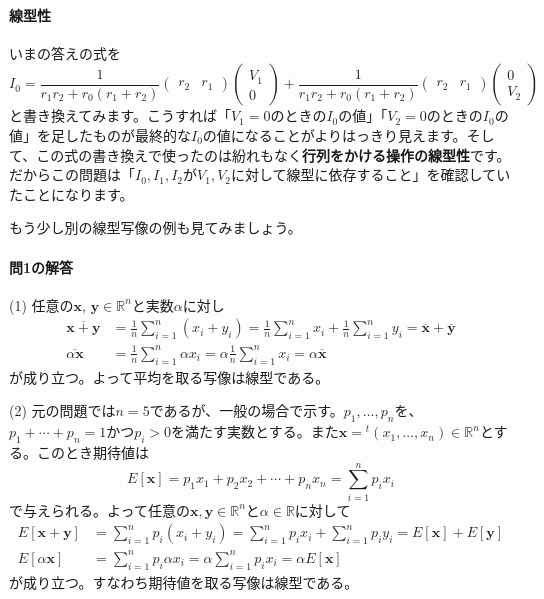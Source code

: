 \paragraph{線型性} いまの答えの式を
\[
I_0
=
\frac{1}{r_1 r_2 + r_0 (r_1 + r_2)}
\begin{pmatrix}
 r_2 & r_1
\end{pmatrix}
\begin{pmatrix}
V_1 \\
0
\end{pmatrix}
+
\frac{1}{r_1 r_2 + r_0 (r_1 + r_2)}
\begin{pmatrix}
 r_2 & r_1
\end{pmatrix}
\begin{pmatrix}
0 \\
V_2
\end{pmatrix}
\]
と書き換えてみます。こうすれば「$V_1 = 0$のときの$I_0$の値」「$V_2 = 0$のときの$I_0$の値」を足したものが最終的な$I_0$の値になることがよりはっきり見えます。そして、この式の書き換えで使ったのは紛れもなく\textbf{行列をかける操作の線型性}です。だからこの問題は「$I_0, I_1, I_2$が$V_1, V_2$に対して線型に依存すること」を確認していたことになります。

もう少し別の線型写像の例も見てみましょう。

\paragraph{問1の解答} (1) 任意の$\bm{x}$, $\bm{y}\in\mathbb{R}^n$と実数$\alpha$に対し
\begin{align*}
\overline{\bm{x} + \bm{y}}
&= \frac{1}{n} \sum_{i = 1}^n (x_i + y_i) = \frac{1}{n} \sum_{i = 1}^n x_i +\frac{1}{n} \sum_{i = 1}^n  y_i
= \overline{\bm{x}} + \overline{\bm{y}} \\
\overline{\alpha \bm{x}}
&= \frac{1}{n} \sum_{i = 1}^n \alpha x_i 
= \alpha \frac{1}{n} \sum_{i = 1}^n x_i 
= \alpha \overline{\bm{x}}
\end{align*}
が成り立つ。よって平均を取る写像は線型である。

\noindent (2) 元の問題では$n = 5$であるが、一般の場合で示す。$p_1,\ldots,p_n$を、$p_1 + \cdots + p_n = 1$かつ$p_i > 0$を満たす実数とする。また$\bm{x} = {}^t(x_1,\ldots, x_n)\in\mathbb{R}^n$とする。このとき期待値は
\[
E[\bm{x}] = p_1 x_1 + p_2 x_2 + \cdots + p_n x_n = \sum_{i = 1}^n p_i x_i
\]
で与えられる。よって任意の$\bm{x}, \bm{y}\in\mathbb{R}^n$と$\alpha\in\mathbb{R}$に対して
\begin{align*}
E[\bm{x} + \bm{y}] &= \sum_{i = 1}^ n p_i (x_i + y_i) = \sum_{i = 1}^ n p_i x_i + \sum_{i = 1}^ n p_i  y_i = E[\bm{x}] + E[\bm{y}] \\
E[\alpha \bm{x}] &= \sum_{i = 1}^ n p_i \alpha x_i = \alpha \sum_{i = 1}^ n p_i x_i = \alpha E[\bm{x}]
\end{align*}
が成り立つ。すなわち期待値を取る写像は線型である。

